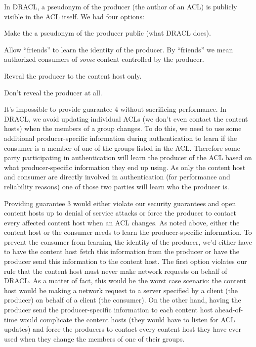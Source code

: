 \documentclass[pdftex,12pt,a4papaer,twoside,notitlepage]{report}
\begin{document}
In DRACL, a pseudonym of the producer (the author of an ACL) is publicly visible
in the ACL itself. We had four options:

\begin{compactenum}
\item Make the a pseudonym of the producer public (what DRACL does).
\item Allow ``friends'' to learn the identity of the producer. By ``friends'' we
  mean authorized consumers of \emph{some} content controlled by the producer.
\item Reveal the producer to the content host only.
\item Don't reveal the producer at all.
\end{compactenum}

It's impossible to provide guarantee 4 without sacrificing performance. In
DRACL, we avoid updating individual ACLs (we don't even contact the content
hosts) when the members of a group changes. To do this, we need to use some
additional producer-specific information during authentication to learn if the
consumer is a member of one of the groups listed in the ACL\@. Therefore some
party participating in authentication will learn the producer of the ACL based on
what producer-specific information they end up using. As only the content host and
consumer are directly involved in authentication (for performance and
reliability reasons) one of those two parties will learn who the producer is.

Providing guarantee 3 would either violate our security guarantees and open
content hosts up to denial of service attacks or force the producer to contact
every affected content host when an ACL changes. As noted above, either the
content host or the consumer needs to learn the producer-specific information.
To prevent the consumer from learning the identity of the producer, we'd either
have to have the content host fetch this information from the producer or have
the producer send this information to the content host. The first option
violates our rule that the content host must never make network requests on
behalf of DRACL\@. As a matter of fact, this would be the worst case scenario:
the content host would be making a network request to a server specified by a
client (the producer) on behalf of a client (the consumer). On the other hand,
having the producer send the producer-specific information to each content host
ahead-of-time would complicate the content hosts (they would have to listen for
ACL updates) and force the producers to contact every content host they have
ever used when they change the members of one of their groups.
\end{document}
